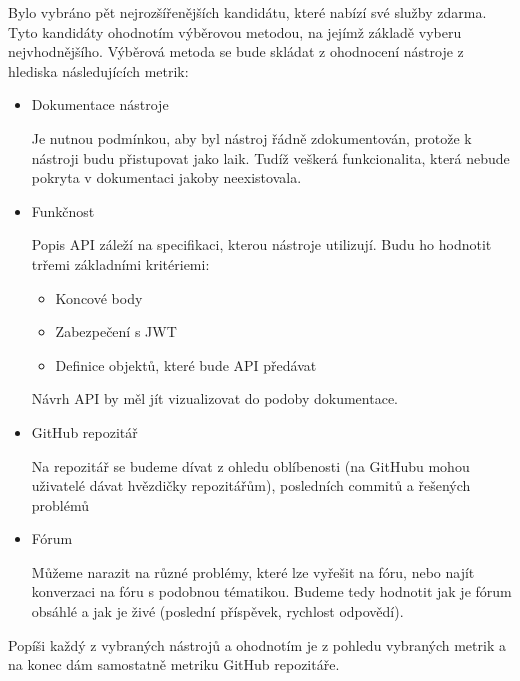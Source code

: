 \documentclass[thesis=B,czech]{FITthesis}[2012/06/26]
\begin{document}
        Bylo vybráno pět nejrozšířenějších kandidátu, které nabízí své služby zdarma. Tyto kandidáty 
        ohodnotím výběrovou metodou, na jejímž základě vyberu nejvhodnějšího. Výběrová metoda se bude skládat z ohodnocení nástroje z hlediska následujících metrik:
        \begin{itemize}
            \item Dokumentace nástroje
            
            	Je nutnou podmínkou, aby byl nástroj řádně zdokumentován, protože k nástroji budu přistupovat jako laik. Tudíž veškerá funkcionalita, která nebude pokryta v dokumentaci jakoby neexistovala.
            \item Funkčnost
           	
               	Popis API záleží na specifikaci, kterou nástroje utilizují. Budu ho hodnotit trřemi základními kritériemi:
       	        \begin{itemize}
               	    \item Koncové body
    		        \item Zabezpečení s JWT
    		        \item Definice objektů, které bude API předávat
        		\end{itemize}
    	        Návrh API by měl jít vizualizovat do podoby dokumentace. 
            \item GitHub repozitář
            
                Na repozitář se budeme dívat z ohledu oblíbenosti (na GitHubu mohou uživatelé dávat hvězdičky repozitářům), posledních commitů a řešených problémů
            \item Fórum
            
                Můžeme narazit na různé problémy, které lze vyřešit na fóru, nebo najít konverzaci na fóru s podobnou tématikou. Budeme tedy hodnotit jak je fórum obsáhlé a jak je živé (poslední příspěvek, rychlost odpovědí).
        \end{itemize}
        Popíši každý z vybraných nástrojů a ohodnotím je z pohledu vybraných metrik a na konec dám samostatně metriku GitHub repozitáře.
\end{document}
